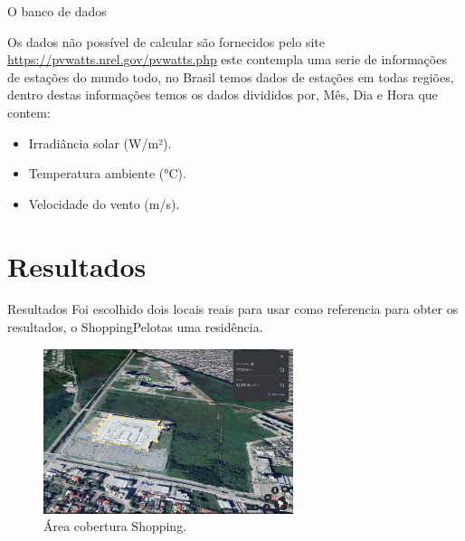 \documentclass{beamer}
\begin{document}
\begin{frame}{O banco de dados}

Os dados não possível de calcular são fornecidos pelo site \url{https://pvwatts.nrel.gov/pvwatts.php} este contempla uma serie de informações de estações do mundo todo, no Brasil temos dados de estações em todas regiões, dentro destas informações temos os dados divididos por, Mês, Dia e Hora que contem:

\begin{itemize}

  \item Irradiância solar (W/m²).
  
  \item Temperatura ambiente (°C).

  \item Velocidade do vento (m/s).

\end{itemize}

\end{frame}


\section{Resultados}
\begin{frame}{Resultados}
Foi escolhido dois locais reais para usar como referencia para obter os resultados, o ShoppingPelotas uma residência.

\begin{figure}[H]
    \centering
    \includegraphics[width=0.65\textwidth]{./Figuras/shopping_1.png}
    \caption{Área cobertura Shopping.}
   \label{fig:shopping_1}
\end{figure}

\end{frame}
\end{document}
